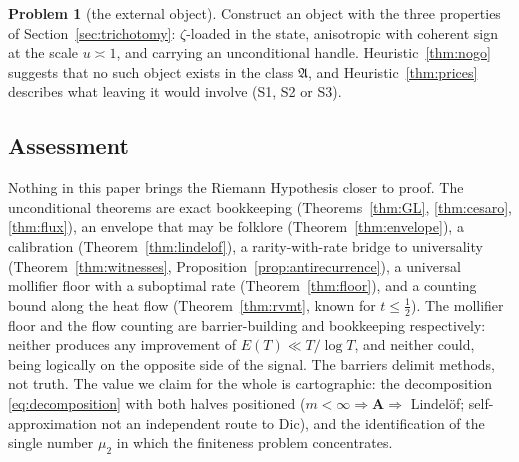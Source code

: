 \documentclass[11pt]{amsart}
\theoremstyle{plain}
\theoremstyle{definition}
\newtheorem{problem}[theorem]{Problem}
\theoremstyle{remark}
\newcommand{\Dic}{\mathrm{Dic}}
\newcommand{\Aax}{\mathbf{A}}
\begin{document}
\begin{problem}[the external object]\label{prob:collapser}
Construct an object with the three properties of Section~\ref{sec:trichotomy}: $\zeta$-loaded in the state, anisotropic with coherent sign at the scale $u\asymp1$, and carrying an unconditional handle. Heuristic~\ref{thm:nogo} suggests that no such object exists in the class $\mathfrak A$, and Heuristic~\ref{thm:prices} describes what leaving it would involve \textup{(S1, S2 or S3)}.
\end{problem}

\subsection{Assessment}

Nothing in this paper brings the Riemann Hypothesis closer to proof. The unconditional theorems are exact bookkeeping (Theorems~\ref{thm:GL}, \ref{thm:cesaro}, \ref{thm:flux}), an envelope that may be folklore (Theorem~\ref{thm:envelope}), a calibration (Theorem~\ref{thm:lindelof}), a rarity-with-rate bridge to universality (Theorem~\ref{thm:witnesses}, Proposition~\ref{prop:antirecurrence}), a universal mollifier floor with a suboptimal rate (Theorem~\ref{thm:floor}), and a counting bound along the heat flow (Theorem~\ref{thm:rvmt}, known for $t\le\tfrac12$). The mollifier floor and the flow counting are barrier-building and bookkeeping respectively: neither produces any improvement of $E(T)\ll T/\log T$, and neither could, being logically on the opposite side of the signal. The barriers delimit methods, not truth. The value we claim for the whole is cartographic: the decomposition \eqref{eq:decomposition} with both halves positioned ($m<\infty\Rightarrow\Aax\Rightarrow$ Lindel\"of; self-approximation not an independent route to $\Dic$), and the identification of the single number $\mu_2$ in which the finiteness problem concentrates.
\end{document}
